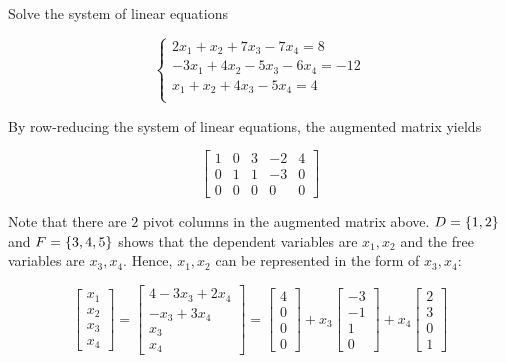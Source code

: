 \documentclass[a4paper,12pt]{article}
\begin{document}
\begin{exm}
  Solve the system of linear equations

  $$\begin{cases}
    2x_{1}+x_{2}+7x_{3}-7x_{4}=8\\
    -3x_{1}+4x_{2}-5x_{3}-6x_{4}=-12\\
    x_{1}+x_{2}+4x_{3}-5x_{4}=4\\
  \end{cases}$$\s

  \ans By row-reducing the system of linear equations, the augmented matrix yields

  $$\begin{bmatrix}
    1 & 0 & 3 & -2 & 4\\
    0 & 1 & 1 & -3 & 0\\
    0 & 0 & 0 & 0 & 0
  \end{bmatrix}$$\s

  Note that there are $2$ pivot columns in the augmented matrix above. $D=\left\{ 1,2\right\}$ and $F=\left\{ 3,4,5\right\}$ shows that the dependent variables are $x_{1},x_{2}$ and the free variables are $x_{3},x_{4}$. Hence, $x_{1},x_{2}$ can be represented in the form of $x_{3},x_{4}$:

  $$\begin{bmatrix}
    x_{1}\\
    x_{2}\\
    x_{3}\\
    x_{4}
  \end{bmatrix}=\begin{bmatrix}
    4-3x_{3}+2x_{4}\\
    -x_{3}+3x_{4}\\
    x_{3}\\
    x_{4}
  \end{bmatrix}=\begin{bmatrix}
    4\\
    0\\
    0\\
    0
  \end{bmatrix}+x_{3}\begin{bmatrix}
    -3\\
    -1\\
    1\\
    0
  \end{bmatrix}+x_{4}\begin{bmatrix}
    2\\
    3\\
    0\\
    1
  \end{bmatrix}$$
\end{exm}\n
\end{document}
